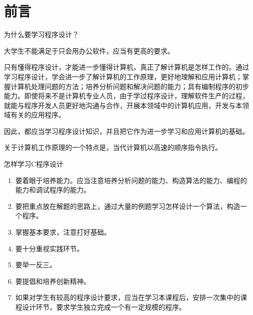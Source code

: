 \chapter{前言}
为什么要学习程序设计？

大学生不能满足于只会用办公软件，应当有更高的要求。

只有懂得程序设计，才能进一步懂得计算机，真正了解计算机是怎样工作的。通过学习程序设计，学会进一步了解计算机的工作原理，更好地理解和应用计算机；掌握计算机处理问题的方法；培养分析问题和解决问题的能力；具有编制程序的初步能力。即使将来不是计算机专业人员，由于学过程序设计，理解软件生产的过程，就能与程序开发人员更好地沟通与合作，开展本领域中的计算机应用，开发与本领域有关的应用程序。

因此，都应当学习程序设计知识，并且把它作为进一步学习和应用计算机的基础。

关于计算机工作原理的一个特点是，当代计算机以高速的顺序指令执行。

怎样学习C程序设计
\begin{enumerate}
	\item 要着眼于培养能力。应当注意培养分析问题的能力、构造算法的能力、编程的能力和调试程序的能力。
	\item 要把重点放在解题的思路上，通过大量的例题学习怎样设计一个算法，构造一个程序。
	\item 掌握基本要求，注意打好基础。
	\item 要十分重视实践环节。
	\item 要举一反三。
	\item 要提倡和培养创新精神。
	\item 如果对学生有较高的程序设计要求，应当在学习本课程后，安排一次集中的课程设计环节，要求学生独立完成一个有一定规模的程序。
\end{enumerate}
